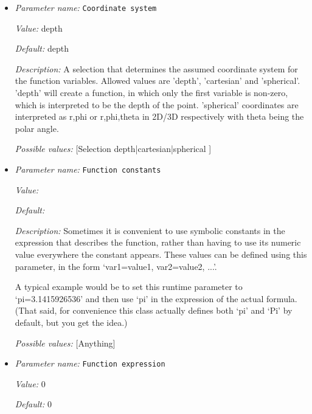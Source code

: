 \begin{itemize}
\item {\it Parameter name:} {\tt Coordinate system}
\label{parameters:Mesh refinement/Maximum refinement function/Coordinate system}


{\it Value:} depth


{\it Default:} depth


{\it Description:} A selection that determines the assumed coordinate system for the function variables. Allowed values are 'depth', 'cartesian' and 'spherical'. 'depth' will create a function, in which only the first variable is non-zero, which is interpreted to be the depth of the point. 'spherical' coordinates are interpreted as r,phi or r,phi,theta in 2D/3D respectively with theta being the polar angle.


{\it Possible values:} [Selection depth|cartesian|spherical ]
\item {\it Parameter name:} {\tt Function constants}
\label{parameters:Mesh refinement/Maximum refinement function/Function constants}


{\it Value:} 


{\it Default:} 


{\it Description:} Sometimes it is convenient to use symbolic constants in the expression that describes the function, rather than having to use its numeric value everywhere the constant appears. These values can be defined using this parameter, in the form `var1=value1, var2=value2, ...'.

A typical example would be to set this runtime parameter to `pi=3.1415926536' and then use `pi' in the expression of the actual formula. (That said, for convenience this class actually defines both `pi' and `Pi' by default, but you get the idea.)


{\it Possible values:} [Anything]
\item {\it Parameter name:} {\tt Function expression}
\label{parameters:Mesh refinement/Maximum refinement function/Function expression}


{\it Value:} 0


{\it Default:} 0



\end{itemize}
